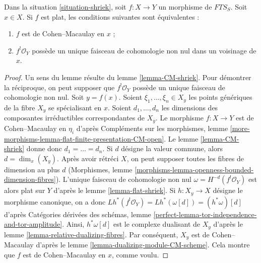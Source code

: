 \begin{lemma}
\label{lemma-affine-flat-Noetherian-CM}
Dans la situation \ref{situation-shriek}, soit $f : X \to Y$ un morphisme de $\textit{FTS}_S$. Soit $x \in X$. Si $f$ est plat, les conditions suivantes sont équivalentes :
\begin{enumerate}
\item $f$ est de Cohen–Macaulay en $x$ ;
\item $f^!\mathcal{O}_Y$ possède un unique faisceau de cohomologie non nul dans un voisinage de $x$.
\end{enumerate}
\end{lemma}

\begin{proof}
Un sens du lemme résulte du lemme \ref{lemma-CM-shriek}. Pour démontrer la réciproque, on peut supposer que $f^!\mathcal{O}_Y$ possède un unique faisceau de cohomologie non nul. Soit $y = f(x)$. Soient $\xi_1, \ldots, \xi_n \in X_y$ les points génériques de la fibre $X_y$ se spécialisant en $x$. Soient $d_1, \ldots, d_n$ les dimensions des composantes irréductibles correspondantes de $X_y$. Le morphisme $f : X \to Y$ est de Cohen–Macaulay en $\eta_i$ d'après Compléments sur les morphismes, lemme \ref{more-morphisms-lemma-flat-finite-presentation-CM-open}. Le lemme \ref{lemma-CM-shriek} donne donc $d_1 = \ldots = d_n$. Si $d$ désigne la valeur commune, alors $d = \dim_x(X_y)$. Après avoir rétréci $X$, on peut supposer toutes les fibres de dimension au plus $d$ (Morphismes, lemme \ref{morphisms-lemma-openness-bounded-dimension-fibres}). L'unique faisceau de cohomologie non nul $\omega = H^{-d}(f^!\mathcal{O}_Y)$ est alors plat sur $Y$ d'après le lemme \ref{lemma-flat-shriek}. Si $h : X_y \to X$ désigne le morphisme canonique, on a donc
$Lh^*(f^!\mathcal{O}_Y) = Lh^*(\omega[d]) = (h^*\omega)[d]$
d'après Catégories dérivées des schémas, lemme \ref{perfect-lemma-tor-independence-and-tor-amplitude}. Ainsi, $h^*\omega[d]$ est le complexe dualisant de $X_y$ d'après le lemme \ref{lemma-relative-dualizing-fibres}. Par conséquent, $X_y$ est de Cohen–Macaulay d'après le lemme \ref{lemma-dualizing-module-CM-scheme}. Cela montre que $f$ est de Cohen–Macaulay en $x$, comme voulu.
\end{proof}

